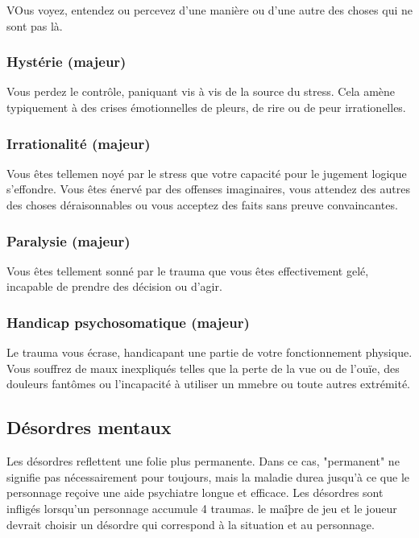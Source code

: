 VOus voyez, entendez ou percevez d'une manière ou d'une autre des choses qui ne sont pas là. 

\subsubsection{Hystérie (majeur)} 

Vous perdez le contrôle, paniquant vis à vis de la source du stress. Cela amène typiquement à des crises émotionnelles de pleurs, de rire ou de peur irrationelles. 

\subsubsection{Irrationalité (majeur)} 

Vous êtes tellemen noyé par le stress que votre capacité pour le jugement logique s'effondre. Vous êtes énervé par des offenses imaginaires, vous attendez des autres des choses déraisonnables ou vous acceptez des faits sans preuve convaincantes. 

\subsubsection{Paralysie (majeur)} 

Vous êtes tellement sonné par le trauma que vous êtes effectivement gelé, incapable de prendre des décision ou d'agir. 

\subsubsection{Handicap psychosomatique (majeur)} 

Le trauma vous écrase, handicapant une partie de votre fonctionnement physique. Vous souffrez de maux inexpliqués telles que la perte de la vue ou de l'ouïe, des douleurs fantômes ou l'incapacité à utiliser un mmebre ou toute autres extrémité. 



\subsection{Désordres mentaux} \label{sec:disorders} 

Les désordres reflettent une folie plus permanente. Dans ce cas, "permanent" ne signifie pas nécessairement pour toujours, mais la maladie durea jusqu'à ce que le personnage reçoive une aide psychiatre longue et efficace. Les désordres sont infligés lorsqu'un personnage accumule 4 traumas. le maîþre de jeu et le joueur devrait choisir un désordre qui correspond à la situation et au personnage. 

